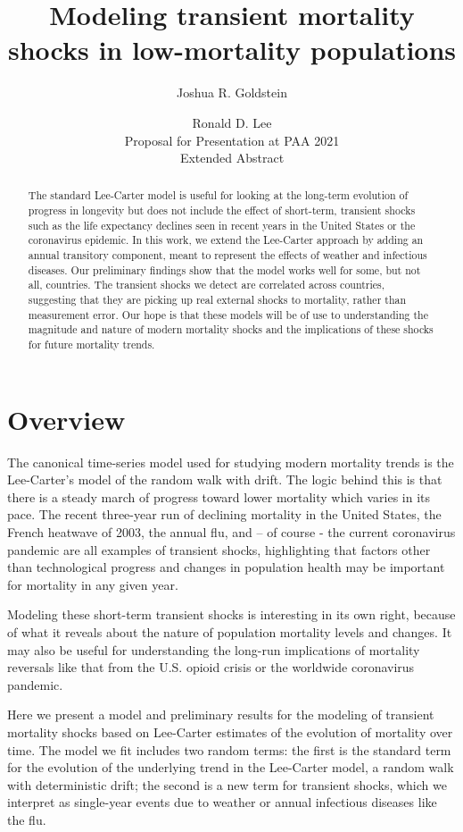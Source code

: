 \documentclass[12pt]{article}
\title{Modeling transient mortality shocks in low-mortality populations}
\author{Joshua R. Goldstein \and Ronald D. Lee \\ Proposal for
  Presentation at PAA 2021 \\ Extended Abstract}
\begin{document}
\maketitle
\begin{abstract}

  The standard Lee-Carter model is useful for looking at the long-term
  evolution of progress in longevity but does not include the effect
  of short-term, transient shocks such as the life expectancy declines
  seen in recent years in the United States or the coronavirus
  epidemic.  In this work, we extend the Lee-Carter approach by adding
  an annual transitory component, meant to represent the effects of
  weather and infectious diseases. Our preliminary findings show that
  the model works well for some, but not all, countries. The transient
  shocks we detect are correlated across countries, suggesting that
  they are picking up real external shocks to mortality, rather than
  measurement error. Our hope is that these models will be of use to
  understanding the magnitude and nature of modern mortality shocks
  and the implications of these shocks for future mortality trends.
  
  
\end{abstract}

\section{Overview}


The canonical time-series model used for studying modern mortality
trends is the Lee-Carter's model of the random walk with drift. The
logic behind this is that there is a steady march of progress toward
lower mortality which varies in its pace. The recent three-year run of
declining mortality in the United States, the French heatwave of 2003,
the annual flu, and -- of course - the current coronavirus pandemic 
are all examples of transient shocks, highlighting that factors other
than technological progress and changes in population health
may be important for mortality in any given year.

Modeling these short-term transient shocks is interesting in its own
right, because of what it reveals about the nature of population
mortality levels and changes.  It may also be useful for understanding
the long-run implications of mortality reversals like that from the
U.S. opioid crisis or the worldwide coronavirus pandemic.

Here we present a model and preliminary results for the modeling of
transient mortality shocks based on Lee-Carter estimates of the
evolution of mortality over time. The model we fit includes two random
terms: the first is the standard term for the evolution of the
underlying trend in the Lee-Carter model, a random walk with deterministic drift; the second
is a new term for transient shocks, which we interpret as single-year
events due to weather or annual infectious diseases like the flu.
\end{document}
